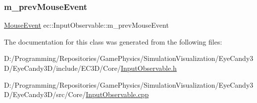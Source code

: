 \subsubsection{\texorpdfstring{m\+\_\+prev\+Mouse\+Event}{m\_prevMouseEvent}}
{\footnotesize\ttfamily \mbox{\hyperlink{structec_1_1_mouse_event}{Mouse\+Event}} ec\+::\+Input\+Observable\+::m\+\_\+prev\+Mouse\+Event\hspace{0.3cm}{\ttfamily [protected]}}



The documentation for this class was generated from the following files\+:\begin{DoxyCompactItemize}
\item 
D\+:/\+Programming/\+Repositories/\+Game\+Physics/\+Simulation\+Visualization/\+Eye\+Candy3\+D/\+Eye\+Candy3\+D/include/\+E\+C3\+D/\+Core/\mbox{\hyperlink{_input_observable_8h}{Input\+Observable.\+h}}\item 
D\+:/\+Programming/\+Repositories/\+Game\+Physics/\+Simulation\+Visualization/\+Eye\+Candy3\+D/\+Eye\+Candy3\+D/src/\+Core/\mbox{\hyperlink{_input_observable_8cpp}{Input\+Observable.\+cpp}}\end{DoxyCompactItemize}
